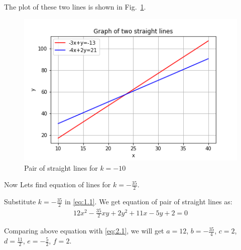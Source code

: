 \documentclass[journal,12pt,twocolumn]{IEEEtran}
\begin{document}
The plot of these two lines is shown in Fig.~\ref{fig:figure1}.
\begin{figure}[ht!]
    \centering
    \includegraphics[width=\columnwidth]{Figure1}
    \caption{Pair of straight lines for $k=-10$}
    \label{fig:figure1}
\end{figure}

Now Lets find equation of lines for $k=-\frac{35}{2}$.

Substitute $k=-\frac{35}{2}$ in \eqref{eq:1.1}. We get equation of pair of straight lines as:
\begin{align}
    12x^2-\frac{35}{2}xy+2y^2+11x-5y+2=0
\end{align}

Comparing above equation with \eqref{eq:2.1}, we will get $a=12$, $b=-\frac{35}{4}$, $c=2$, $d=\frac{11}{2}$, $e=-\frac{5}{2}$, $f=2$.
\end{document}
